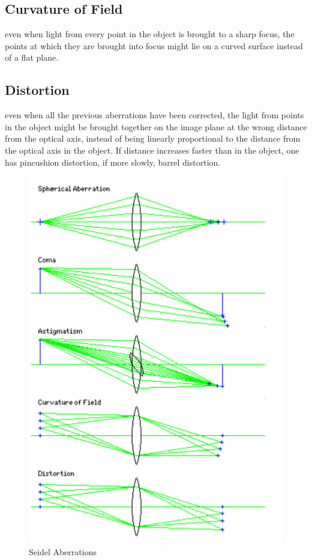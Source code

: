 \documentclass[../main.tex]{subfiles}
\begin{document}
	\subsection{Curvature of Field}
	even when light from every point in the object is brought to a sharp focus, the points at which they are brought into focus might lie on a curved surface instead of a flat plane.
	\subsection{Distortion}
	even when all the previous aberrations have been corrected, the light from points in the object might be brought together on the image plane at the wrong distance from the optical axis, instead of being linearly proportional to the distance from the optical axis in the object. If distance increases faster than in the object, one has pincushion distortion, if more slowly, barrel distortion.
	\begin{figure}[h!]
		\centering
		\includegraphics[scale=0.8]{../graphics/Geometrical_optics14.png}
		\caption{Seidel Aberrations}
		\label{fig:Aberration}
	\end{figure}
\end{document}
